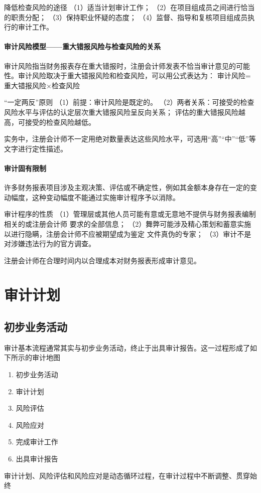 \documentclass[UTF8,12pt]{ctexart}
\numberwithin{equation}{section} %
\numberwithin{figure}{section}
\numberwithin{table}{section}
\begin{document}
	降低检查风险的途径
	（1）适当计划审计工作；
	（2）在项目组成员之间进行恰当的职责分配；
	（3）保持职业怀疑的态度；
	（4）监督、指导和复核项目组成员执行的审计工作。
	
	\paragraph{审计风险模型——重大错报风险与检查风险的关系}
	
	审计风险指当财务报表存在重大错报时，注册会计师发表不恰当审计意见的可能性。审计风险取决于重大错报风险和检查风险，可以用公式表达为：
	审计风险=重大错报风险×检查风险
	
	“一定两反”原则
	（1）前提：审计风险是既定的。
	（2）两者关系：可接受的检查风险水平与评估的认定层次重大错报风险呈反向关系；
	评估的重大错报风险越高，可接受的检查风险越低。
	
	
	实务中，注册会计师不一定用绝对数量表达这些风险水平，可选用“高”“中”“低”等文字进行定性描述。
	
	\paragraph{审计固有限制}
	许多财务报表项目涉及主观决策、评估或不确定性，例如其金额本身存在一定的变动幅度，这种变动幅度不能通过实施审计程序予以消除。
	
	审计程序的性质
	（1）管理层或其他人员可能有意或无意地不提供与财务报表编制相关的或注册会计师
	要求的全部信息；
	（2）舞弊可能涉及精心策划和蓄意实施以进行隐瞒，注册会计师不应被期望成为鉴定
	文件真伪的专家；
	（3）审计不是对涉嫌违法行为的官方调查。
	
	
	注册会计师在合理时间内以合理成本对财务报表形成审计意见。
	
	\newpage
	\section{审计计划}
	\subsection{初步业务活动}
	审计基本流程通常其实与初步业务活动，终止于出具审计报告。这一过程形成了如下所示的审计地图
	\begin{enumerate}
		\item 初步业务活动
		
		\item 审计计划
		
		\item 风险评估
		
		\item 风险应对
		
		\item 完成审计工作
		
		\item 出具审计报告
	\end{enumerate}
	审计计划、风险评估和风险应对是动态循环过程，在审计过程中不断调整、贯穿始终
	
\end{document}
